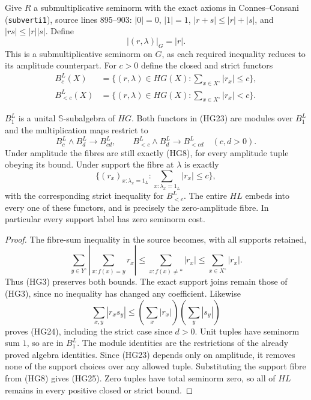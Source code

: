 Give $R$ a submultiplicative seminorm with the exact axioms in
Connes--Consani (\texttt{subverti1}), source lines 895--903:
$|0|=0$, $|1|=1$, $|r+s|\le |r|+|s|$, and
$|rs|\le |r||s|$.  Define
\begin{equation}\tag{HG22}
 |(r,\lambda)|_G=|r|.
\end{equation}
This is a submultiplicative seminorm on $G$, as each required
inequality reduces to its amplitude counterpart.  For $c>0$
define the closed and strict functors
\begin{equation}\tag{HG23}
 \begin{aligned}
 B_c^L(X)&=\{(r,\lambda)\in HG(X):\sum_{x\in X^\circ}|r_x|\le c\},\\
 B_{<c}^L(X)&=\{(r,\lambda)\in HG(X):\sum_{x\in X^\circ}|r_x|<c\}.
 \end{aligned}
\end{equation}
\begin{theorem}\label{HG:bound}
$B_1^L$ is a unital $\mathbb S$-subalgebra of $HG$.
Both functors in (HG23) are modules over $B_1^L$ and the
multiplication maps restrict to
\begin{equation}\tag{HG24}
 B_c^L\wedge B_d^L\to B_{cd}^L,
 \qquad B_{<c}^L\wedge B_d^L\to B_{<cd}^L
 \quad(c,d>0).
\end{equation}
Under amplitude the fibres are still exactly (HG8), for every
amplitude tuple obeying its bound.  Under support the fibre at
$\lambda$ is exactly
\begin{equation}\tag{HG25}
 \{(r_x)_{x:\lambda_x=1_L}:
       \sum_{x:\lambda_x=1_L}|r_x|\le c\},
\end{equation}
with the corresponding strict inequality for $B_{<c}^L$.
The entire $HL$ embeds into every one of these functors, and
is precisely the zero-amplitude fibre.  In particular every
support label has zero seminorm cost.
\end{theorem}
\begin{proof}
The fibre-sum inequality in the source becomes, with all supports
retained,
\begin{equation}\tag{HG26}
 \sum_{y\in Y^\circ}\left|\sum_{x:f(x)=y}r_x\right|
 \le\sum_{x:f(x)\ne *}|r_x|
 \le\sum_{x\in X^\circ}|r_x|.
\end{equation}
Thus (HG3) preserves both bounds.  The exact support joins
remain those of (HG3), since no inequality has changed any
coefficient.  Likewise
\begin{equation}\tag{HG27}
 \sum_{x,y}|r_xs_y|\le
         \left(\sum_x|r_x|\right)\left(\sum_y|s_y|\right)
\end{equation}
proves (HG24), including the strict case since $d>0$.
Unit tuples have seminorm sum $1$, so are in $B_1^L$.
The module identities are the restrictions of the already
proved algebra identities.  Since (HG23) depends only on
amplitude, it removes none of the support choices over any
allowed tuple.  Substituting the support fibre from (HG8)
gives (HG25).  Zero tuples have total seminorm zero, so all
of $HL$ remains in every positive closed or strict bound.
\end{proof}

